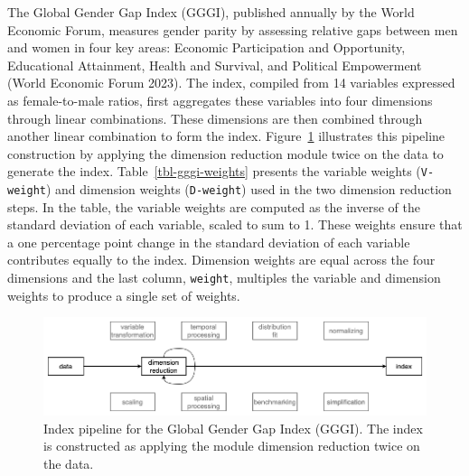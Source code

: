 \documentclass[
]{interact}
\begin{document}
The Global Gender Gap Index (GGGI), published annually by the World
Economic Forum, measures gender parity by assessing relative gaps
between men and women in four key areas: Economic Participation and
Opportunity, Educational Attainment, Health and Survival, and Political
Empowerment (World Economic Forum 2023). The index, compiled from 14
variables expressed as female-to-male ratios, first aggregates these
variables into four dimensions through linear combinations. These
dimensions are then combined through another linear combination to form
the index. Figure~\ref{fig-pp-gggi} illustrates this pipeline
construction by applying the dimension reduction module twice on the
data to generate the index. Table~\ref{tbl-gggi-weights} presents the
variable weights (\texttt{V-weight}) and dimension weights
(\texttt{D-weight}) used in the two dimension reduction steps. In the
table, the variable weights are computed as the inverse of the standard
deviation of each variable, scaled to sum to 1. These weights ensure
that a one percentage point change in the standard deviation of each
variable contributes equally to the index. Dimension weights are equal
across the four dimensions and the last column, \texttt{weight},
multiples the variable and dimension weights to produce a single set of
weights.

\begin{figure}

{\centering \includegraphics[width=1\textwidth,height=0.9\textheight]{figures/pipeline-gggi.png}

}

\caption{\label{fig-pp-gggi}Index pipeline for the Global Gender Gap
Index (GGGI). The index is constructed as applying the module dimension
reduction twice on the data.}

\end{figure}
\end{document}

